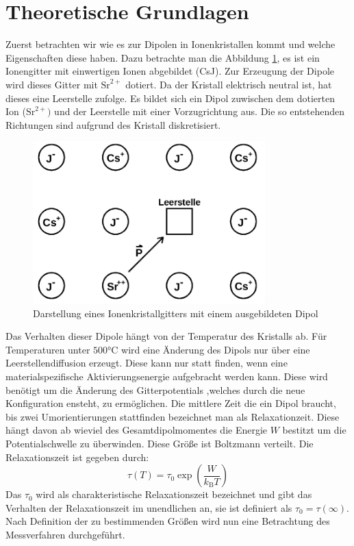 \section{Theoretische Grundlagen}
\label{sec:Theorie}
Zuerst betrachten wir wie es zur Dipolen in Ionenkristallen kommt und welche
Eigenschaften diese haben. Dazu betrachte man die Abbildung \ref{theo1}, es ist
ein Ionengitter mit einwertigen Ionen abgebildet (CsJ). Zur Erzeugung
der Dipole wird dieses Gitter mit $\text{Sr}^{2+}$ dotiert. Da der Kristall
elektrisch neutral ist, hat dieses eine Leerstelle zufolge. Es bildet
sich ein Dipol zuwischen dem dotierten Ion ($\text{Sr}^{2+})$ und der Leerstelle
mit einer Vorzugrichtung aus. Die so entstehenden Richtungen sind aufgrund
des Kristall diskretisiert.
\begin{figure}
\centering
\includegraphics[width=0.8\textwidth]{ressources/ionengitter.png}
\caption{Darstellung eines Ionenkristallgitters mit einem ausgebildeten Dipol}
\label{theo1}
\end{figure}
Das Verhalten dieser Dipole hängt von der Temperatur des Kristalls ab. Für
Temperaturen unter $500°$C wird eine Änderung des Dipols nur über eine
Leerstellendiffusion erzeugt.
Diese kann nur statt finden, wenn eine materialspezifische Aktivierungsenergie
aufgebracht werden kann. Diese wird benötigt um die Änderung des Gitterpotentials
,welches durch die neue Konfiguration ensteht, zu ermöglichen. Die mittlere
Zeit die ein Dipol braucht, bis zwei Umorientierungen stattfinden bezeichnet man
als Relaxationzeit. Diese hängt davon ab wieviel des Gesamtdipolmomentes die Energie
$W$ bestitzt um die Potentialschwelle zu überwinden. Diese Größe ist
Boltzmann verteilt. Die Relaxationszeit ist gegeben durch:
$$
\tau(T)=\tau_0 \exp(\frac{W}{k_\text{B}T})
$$
Das $\tau_0$ wird als charakteristische Relaxationszeit bezeichnet und
gibt das Verhalten der Relaxationszeit im unendlichen an, sie ist
definiert als $\tau_0=\tau(\infty)$. Nach Definition der zu bestimmenden
Größen wird nun eine Betrachtung des Messverfahren durchgeführt.
